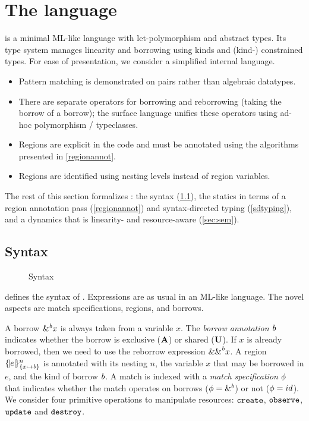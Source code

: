 \section{The \lang language}

\lang is a minimal ML-like language with
let-polymorphism and abstract types. Its type system manages
linearity and borrowing using kinds and (kind-) constrained types.
For ease of presentation, we consider a simplified internal language.
\begin{itemize}[topsep=0pt]
\item Pattern matching is demonstrated on pairs rather than algebraic
  datatypes.
\item There are separate operators for borrowing and reborrowing (taking
  the borrow of a borrow); the surface language unifies these
  operators using ad-hoc polymorphism / typeclasses.
\item Regions are explicit in the code and must be annotated using the
  algorithms presented in \cref{regionannot}.
\item Regions are identified using nesting levels instead of region
  variables.
\end{itemize}

The rest of this section formalizes  \lang: the syntax (\cref{syntax}),
the statics in terms of a region annotation pass (\cref{regionannot}) and
syntax-directed typing (\cref{sdtyping}),
and a dynamics that is linearity- and resource-aware (\cref{sec:sem}).

\subsection{Syntax}
\label{syntax}

\begin{figure}[!tb]
  
  \vspace{-7pt}
  \caption{Syntax}
  \label{grammar}
  \vspace{-10pt}
\end{figure}


 defines the syntax of \lang. Expressions are as usual
in an ML-like language.  The novel aspects are match
specifications, regions, and borrows.

A borrow $\borrow{x}$ is always taken from a variable $x$. The
\emph{borrow annotation} $\BORROW$ indicates whether the borrow is exclusive
($\MBORROW$) or shared ($\IBORROW$). If $x$ is already borrowed,
then we need to use the reborrow expression $\reborrow{x}$.
%
A region $\region{\Sone x\BORROW}{e}$ is annotated with its nesting $n$, the variable $x$ that may be borrowed in $e$, and the kind of borrow $\BORROW$.
%
A match is indexed with a \emph{match specification} $\etransfm$ that indicates
whether the match operates on borrows ($\etransfm=\&^b$) or not ($\etransfm=id$).
%
We consider four primitive operations to manipulate resources:
$\create$, $\observe$, $\update$ and $\destroy$.

